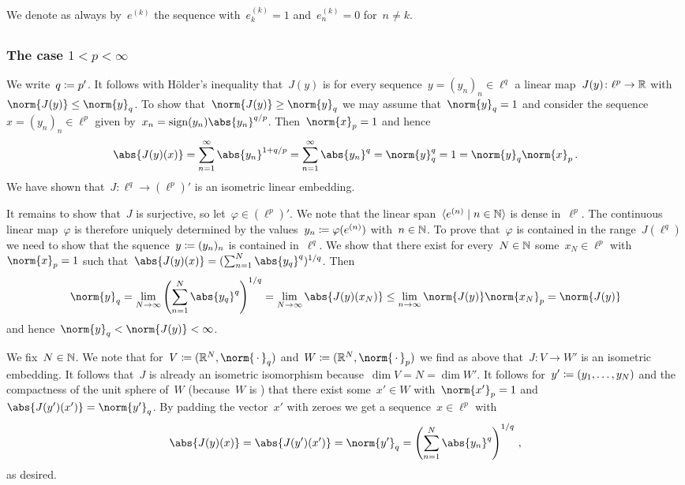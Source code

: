 \section{}

We denote as always by~$e^{(k)}$ the sequence with~$e^{(k)}_k = 1$ and~$e^{(k)}_n = 0$ for~$n \neq k$.





\subsection{}



\subsubsection{The case $1 < p < \infty$}

We write~$q \coloneqq p'$.
It follows with Hölder’s inequality that~$J(y)$ is for every sequence~$y = (y_n)_n \in \ell^q$ a {\welldef} linear map~$J(y) \colon \ell^p \to \mathbb{R}$ with~$\norm{J(y)} \leq \norm{y}_q$.
To show that~$\norm{J(y)} \geq \norm{y}_q$ we may assume that~$\norm{y}_q = 1$ and consider the sequence~$x = (y_n)_n \in \ell^p$ given by~$x_n = \sign(y_n) \abs{y_n}^{q/p}$.
Then~$\norm{x}_p = 1$ and hence
\[
    \abs{J(y)(x)}
  = \sum_{n=1}^\infty \abs{y_n}^{1 + q/p}
  = \sum_{n=1}^\infty \abs{y_n}^q
  = \norm{y}_q^q
  = 1
  = \norm{y}_q \norm{x}_p \,.
\]
We have shown that~$J \colon \ell^q \to (\ell^p)'$ is an isometric linear embedding.

It remains to show that~$J$ is surjective, so let~$\varphi \in (\ell^p)'$.
We note that the linear span~$\gen{e^{(n)} \suchthat n \in \Natural}$ is dense in~$\ell^p$.
The continuous linear map~$\varphi$ is therefore uniquely determined by the values~$y_n \coloneqq \varphi(e^{(n)})$ with~$n \in \mathbb{N}$.
To prove that~$\varphi$ is contained in the range~$J(\ell^q)$ we need to show that the squence~$y \coloneqq (y_n)_n$ is contained in~$\ell^q$.
We show that there exist for every~$N \in \mathbb{N}$ some~$x_N \in \ell^p$ with~$\norm{x}_p = 1$ such that~$\abs{J(y)(x)} = (\sum_{n=1}^N \abs{y_q}^q)^{1/q}$.
Then
\[
        \norm{y}_q
  =     \lim_{N \to \infty} \left( \sum_{n=1}^N \abs{y_q}^q \right)^{1/q}
  =     \lim_{N \to \infty} \abs{J(y)(x_N)}
  \leq  \lim_{n \to \infty} \norm{J(y)} \norm{x_N}_p
  =     \norm{J(y)}
\]
and hence~$\norm{y}_q < \norm{J(y)} < \infty$.

We fix~$N \in \mathbb{N}$.
We note that for~$V \defined (\Real^N, \norm{\,\cdot\,}_q)$ and~$W \defined (\Real^N, \norm{\,\cdot\,}_p)$ we find as above that~$J \colon V \to W'$ is an isometric embedding.
It follows that~$J$ is already an isometric isomorphism because~$\dim V = N = \dim W'$.
It follows for~$y' \coloneqq (y_1, \dotsc, y_N)$ and the compactness of the unit sphere of~$W$ (because~$W$ is {\fd}) that there exist some~$x' \in W$ with~$\norm{x'}_p = 1$ and~$\abs{J(y')(x')} = \norm{y'}_q$.
By padding the vector~$x'$ with zeroes we get a sequence~$x \in \ell^p$ with
\[
    \abs{J(y)(x)}
  = \abs{J(y')(x')}
  = \norm{y'}_q
  = \left( \sum_{n=1}^N \abs{y_n}^q \right)^{1/q} \,,
\]
as desired.



